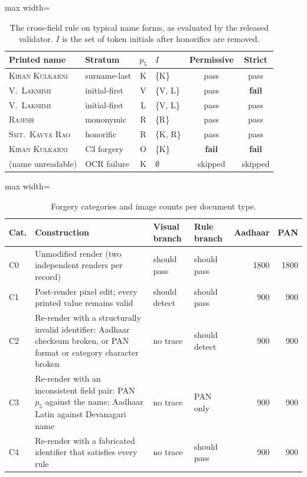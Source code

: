 \documentclass[12pt]{article}
\begin{document}
\clearpage
\begin{table}[H]
\caption{The cross-field rule on typical name forms, as evaluated by
the released validator. $I$ is the set of token initials after
honorifics are removed.}
\label{tab:semexamples}
\centering
\scriptsize
\setlength{\tabcolsep}{3pt}
\renewcommand{\arraystretch}{1.12}
\begin{adjustbox}{max width=\linewidth}
\begin{tabular}{@{}l l c l c c@{}}
\toprule
Printed name & Stratum & $p_5$ & $I$ & Permissive & Strict \\
\midrule
\textsc{Kiran Kulkarni}  & surname-last  & K & \{K\}    & pass & pass \\
\textsc{V.\ Lakshmi}     & initial-first & V & \{V, L\} & pass & \textbf{fail} \\
\textsc{V.\ Lakshmi}     & initial-first & L & \{V, L\} & pass & pass \\
\textsc{Rajesh}          & mononymic     & R & \{R\}    & pass & pass \\
\textsc{Smt.\ Kavya Rao} & honorific     & R & \{K, R\} & pass & pass \\
\textsc{Kiran Kulkarni}  & C3 forgery    & O & \{K\}    & \textbf{fail} & \textbf{fail} \\
(name unreadable)        & OCR failure   & K & $\emptyset$ & skipped & skipped \\
\bottomrule
\end{tabular}
\end{adjustbox}
\end{table}
\clearpage
\begin{table}[H]
\caption{Forgery categories and image counts per document type.}
\label{tab:forgery}
\centering
\footnotesize
\renewcommand{\arraystretch}{1.12}
\begin{adjustbox}{max width=\linewidth}
\begin{tabular}{@{}l p{8.3cm} l l r r@{}}
\toprule
Cat. & Construction & Visual branch & Rule branch & Aadhaar & PAN \\
\midrule
C0 & Unmodified render (two independent renders per record) & should pass & should pass & 1800 & 1800 \\
C1 & Post-render pixel edit; every printed value remains valid & should detect & should pass & 900 & 900 \\
C2 & Re-render with a structurally invalid identifier: Aadhaar checksum broken, or PAN format or category character broken & no trace & should detect & 900 & 900 \\
C3 & Re-render with an inconsistent field pair: PAN $p_5$ against the name; Aadhaar Latin against Devanagari name & no trace & PAN only & 900 & 900 \\
C4 & Re-render with a fabricated identifier that satisfies every rule & no trace & should pass & 900 & 900 \\
\bottomrule
\end{tabular}
\end{adjustbox}
\end{table}
\end{document}
